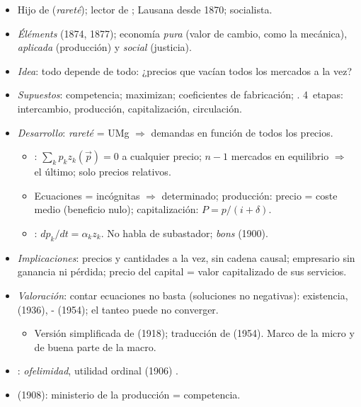 \documentclass{article}
\begin{document}
\begin{columnas}
\begin{itemize}
\item Hijo de  (\emph{rareté}); lector de ; Lausana desde 1870; socialista.
\item \emph{Éléments} (1874, 1877); economía \emph{pura} (valor de cambio, como la mecánica), \emph{aplicada} (producción) y \emph{social} (justicia).
\end{itemize}
\begin{itemize}
\item \emph{Idea}: todo depende de todo: ¿precios que vacían todos los mercados a la vez? 
\item \emph{Supuestos}: competencia; maximizan; coeficientes de fabricación; . 4~etapas: intercambio, producción, capitalización, circulación.
\item \emph{Desarrollo}: \emph{rareté} = UMg $\Rightarrow$ demandas en función de todos los precios.
  \begin{itemize}
  \item {}: $\sum_kp_kz_k(\vec p)=0$ a cualquier precio; $n-1$ mercados en equilibrio $\Rightarrow$ el último; solo precios relativos.
  \item Ecuaciones = incógnitas $\Rightarrow$ determinado; producción: precio = coste medio (beneficio nulo); capitalización: $P=p/(i+\delta)$.
  \item {}: $dp_k/dt=\alpha_kz_k$. No habla de subastador; \emph{bons} (1900).
  \end{itemize}
\item \emph{Implicaciones}: precios y cantidades a la vez, sin cadena causal; empresario sin ganancia ni pérdida; precio del capital = valor capitalizado de sus servicios.
\item \emph{Valoración}: contar ecuaciones no basta (soluciones no negativas): existencia,  (1936), - (1954); el tanteo puede no converger.
  \begin{itemize}
  \item Versión simplificada de  (1918); traducción de  (1954). Marco de la micro y de buena parte de la macro.
  \end{itemize}
\end{itemize}
\begin{itemize}
\item {}: \emph{ofelimidad}, utilidad ordinal (1906) .
\item {} (1908): ministerio de la producción = competencia.
\end{itemize}


\end{columnas}
\end{document}
